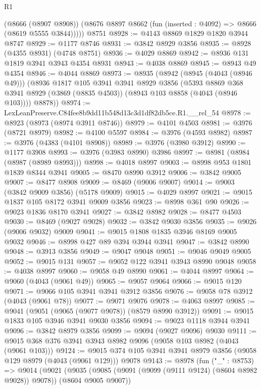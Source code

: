 \begin{lexlean}{R1}
\begin{coremodule}
        (@8666 (@8907 @8908))
        (@8676 @8897 @8662 (fun (inserted : @4092) => @8666 (@8619 @5555 @3844)))))
    @8751
@8928 := @4143 @8869 @1829 @1820 @3944 @8747
@8929 := @1177 @8746
@8931 := @3842 @8929 @3856
@8935 := @8928 (@4355 @8931) (@4748 @8751)
@8936 := @4029 @8869
@8942 := @8936 @131 @1819 @3941 @3943 @4354 @8931
@8943 := @4038 @8869
@8945 := @8943 @49 @4354
@8946 := @4044 @8869
@8973 := @8935
    (@8942
      (@8945 (@4043 (@8946 @49)))
      (@8936
        @1817
        @105
        @3941
        @3941
        @8929
        @3856
        (@5393 @8869 @368 @3941 @8929 (@3869 (@8835 @4503)) (@8943 @103 @8858 (@4043 (@8946 @103))))
        @8878))
@8974 := LexLeanPreserve.C84fee8b9dd11b548d13c3d1df82db5ce.R1.__rel_54
@8978 := @8923 (@8973 (@8974 @3911 @8746))
@8979 := @4101 @4503
@8981 := @3976 (@8721 @8979)
@8982 := @4100 @5597
@8984 := @3976 (@4593 @8982)
@8987 := @3976 (@4383 (@4101 @8908))
@8989 := @3976 (@3980 @3912)
@8990 := @1177 @3908
@8993 := @3976 (@3983 @8990) @3986
@8997 := @8981 (@8984 (@8987 (@8989 @8993)))
@8998 := @4018 @8997
@9003 := @8998 @953 @1801 @1839 @8344 @3941
@9005 := @8470 @8990 @3912
@9006 := @3842 @9005
@9007 := @8477 @8908
@9009 := @8469 (@9006 @9007)
@9014 := @9003 (@3842 @9009 @3856) (@5178 @9009)
@9015 := @4029 @8997
@9021 := @9015 @1837 @105 @8172 @3941 @9009 @3856
@9023 := @8998 @361 @90
@9026 := @9023 @1836 @8170 @3941
@9027 := @3842 @8982
@9028 := @8477 @4503
@9030 := @8469 (@9027 @9028)
@9032 := @3842 @9030 @3856
@9035 := @9026 (@9006 @9032) @9009
@9041 := @9015 @1808 @1835 @3946 @8169 @9005 @9032
@9046 := @8998 @427 @89 @394 @3944 @3941
@9047 := @3842 @8990
@9048 := @3913 @3856
@9049 := @9047 @9048
@9051 := @9046 @9049 @9005
@9052 := @9015 @131
@9057 := @9052 @122 @3941 @3943 @8990 @9048
@9058 := @4038 @8997
@9060 := @9058 @49 @8990
@9061 := @4044 @8997
@9064 := @9060 (@4043 (@9061 @49))
@9065 := @9057 @9064
@9066 := @9015 @120
@9071 := @9066 @105 @3941 @3941 @3912 @3856
@9076 := @9058 @78 @3912 (@4043 (@9061 @78))
@9077 := @9071 @9076
@9078 := @4063 @8997
@9085 := @9041 (@9051 (@9065 (@9077 @9078)) (@8579 @8990 @3912))
@9091 := @9015 @1833 @105 @3946 @3941 @9030 @3856
@9094 := @9023 @1118 @3944 @3941
@9096 := @3842 @8979 @3856
@9099 := @9094 (@9027 @9096) @9030
@9111 := @9015 @368 @376 @3941 @3943 @8982 @9096 (@9058 @103 @8982 (@4043 (@9061 @103)))
@9124 := @9015 @374 @105 @3941 @3941 @8979 @3856 (@9058 @129 @8979 (@4043 (@9061 @129))) @9078
@9143 := @8978
    (fun ("_" : @8753) =>
    @9014
      (@9021
        (@9035 (@9085 (@9091 (@9099 (@9111 @9124) (@8604 @8982 @9028)) @9078)) (@8604 @9005 @9007))

\end{coremodule}
\end{lexlean}
